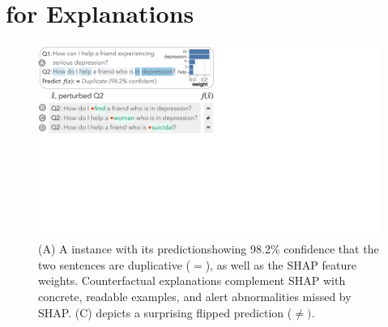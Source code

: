 
\newcommand{\fwone}[1]{\colbox{cfwone}{#1}\xspace}
\newcommand{\fwtwo}[1]{\colbox{cfwtwo}{#1}\xspace}
\newcommand{\fwthree}[1]{\colbox{cfwthree}{#1}\xspace}
\newcommand{\fwfour}[1]{\colbox{cfwfour}{#1}\xspace}

\newcommand{\fexp}[2]{\texttt{[{\color{darkgray}{#1:#2}}]}\xspace}
\newcommand{\fexptag}[1]{\fexp{TAG}{#1}}
\newcommand{\fexpfrom}[1]{\fexp{FROM}{#1}}
\newcommand{\fexpto}[1]{\fexp{TO}{#1}}
\newcommand{\fexptemp}[1]{\fexp{TEMP}{#1}}


\section{\sysname for Explanations}
\label{sec:app_explain}




\begin{figure}[t]
\centering
\includegraphics[trim={0 21cm 33cm 0cm},clip,width=1\columnwidth]{figures/explanation_v2.pdf}
\vspace{-15pt}
\caption{
(A) A \qqp instance with its prediction\footnotemark showing 98.2\% confidence that the two sentences are duplicative ($=$), as well as the SHAP feature weights.
Counterfactual explanations complement SHAP with concrete, readable examples, and alert abnormalities missed by SHAP. \eg (C)
depicts a surprising flipped prediction ($\neq)$.
}
\vspace{-10pt}
\label{fig:explanation}
\end{figure}

